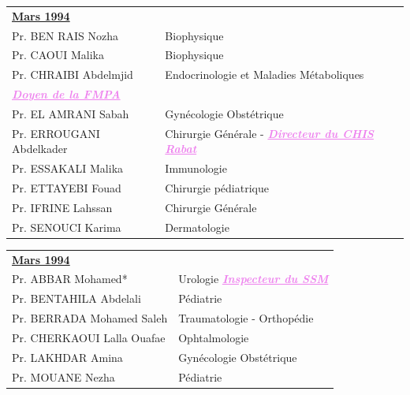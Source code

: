 \begin{table}[H]
\begin{tabular}{l l}
  \multicolumn{2}{l}{\textbf{\underline{Mars 1994}}}\vspace*{.5em}\\
  Pr. BEN RAIS Nozha & \hspace*{2em} Biophysique \\
  Pr. CAOUI Malika & \hspace*{2em} Biophysique \\
  Pr. CHRAIBI Abdelmjid & \hspace*{2em} Endocrinologie et Maladies Métaboliques \\
  \textcolor{violet}{\textbf{\emph{\underline{Doyen de la FMPA }}}} & \\
  Pr. EL AMRANI Sabah	& \hspace*{2em} Gynécologie Obstétrique\\
  Pr. ERROUGANI Abdelkader &	\hspace*{2em} Chirurgie Générale  - \textcolor{violet}{\textbf{\emph{\underline{Directeur du CHIS Rabat}}}}\\ 

Pr. ESSAKALI Malika &	\hspace*{2em} Immunologie \\
Pr. ETTAYEBI Fouad	& \hspace*{2em} Chirurgie pédiatrique\\
Pr. IFRINE Lahssan &	\hspace*{2em} Chirurgie Générale\\
Pr. SENOUCI Karima &	\hspace*{2em} Dermatologie\\
 \end{tabular}
\end{table}
 
 \vspace*{1em}

 \begin{table}[H]
 \begin{tabular}{l l}
  \multicolumn{2}{l}{\textbf{\underline{Mars 1994}}}\vspace*{0.5em}\\
  Pr. ABBAR Mohamed* & \hspace*{2em} Urologie   \textcolor{violet}{\textbf{\emph{\underline{Inspecteur du SSM }}}} \\
  Pr. BENTAHILA Abdelali & \hspace*{2em} Pédiatrie \\
  Pr. BERRADA Mohamed Saleh & \hspace*{2em} Traumatologie - Orthopédie \\
  Pr. CHERKAOUI Lalla Ouafae	& \hspace*{2em} Ophtalmologie\\
  Pr. LAKHDAR Amina &	\hspace*{2em} Gynécologie Obstétrique \\
  Pr. MOUANE Nezha  & \hspace*{2em} Pédiatrie \\
 \end{tabular}
\end{table}

